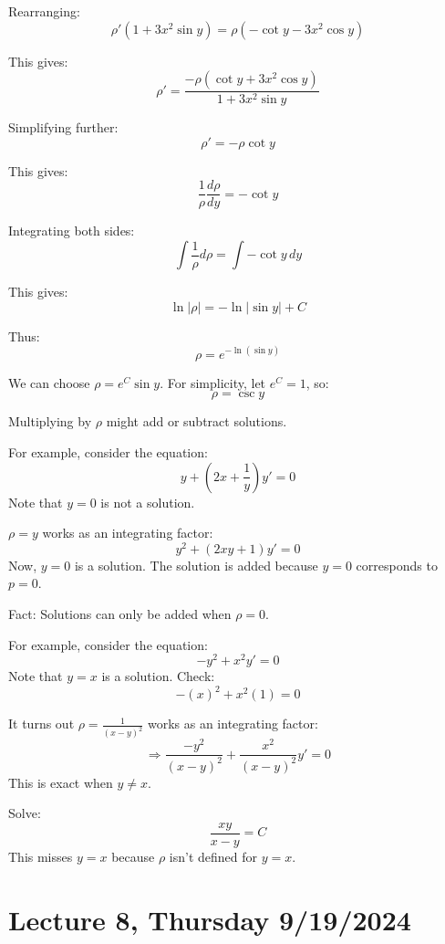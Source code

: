 \documentclass{article}
\begin{document}
Rearranging:
\[
\rho' (1 + 3x^2 \sin y) = \rho (-\cot y - 3x^2 \cos y)
\]

This gives:
\[
\rho' = \frac{-\rho (\cot y + 3x^2 \cos y)}{1 + 3x^2 \sin y}
\]

Simplifying further:
\[
\rho' = -\rho \cot y
\]

This gives:
\[
\frac{1}{\rho} \frac{d\rho}{dy} = -\cot y
\]

Integrating both sides:
\[
\int \frac{1}{\rho} d\rho = \int -\cot y \, dy
\]

This gives:
\[
\ln|\rho| = -\ln|\sin y| + C
\]

Thus:
\[
\rho = e^{-\ln(\sin y)} 
\]

We can choose \(\rho = e^C \sin y\). For simplicity, let \(e^C = 1\), so:
\[
\rho = \csc y
\]


Multiplying by \(\rho\) might add or subtract solutions.

For example, consider the equation:
\[
y + \left(2x + \frac{1}{y}\right)y' = 0
\]
Note that \(y = 0\) is not a solution.

\(\rho = y\) works as an integrating factor:
\[
y^2 + (2xy + 1)y' = 0
\]
Now, \(y = 0\) is a solution. The solution is added because \(y = 0\) corresponds to \(p = 0\).

Fact: Solutions can only be added when \(\rho = 0\).

For example, consider the equation:
\[
-y^2 + x^2 y' = 0
\]
Note that \(y = x\) is a solution. Check:
\[
-(x)^2 + x^2(1) = 0
\]

It turns out \(\rho = \frac{1}{(x - y)^2}\) works as an integrating factor:
\[
\Rightarrow \frac{-y^2}{(x - y)^2} + \frac{x^2}{(x - y)^2}y' = 0
\]
This is exact when \(y \neq x\).

Solve:
\[
\frac{xy}{x - y} = C
\]
This misses \(y = x\) because \(\rho\) isn't defined for \(y = x\).


\section*{Lecture 8, Thursday 9/19/2024}

\end{document}
